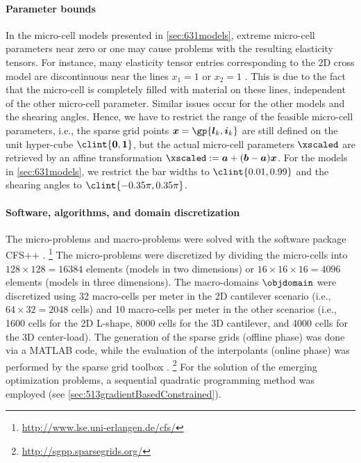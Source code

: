 \paragraph{Parameter bounds}

In the micro-cell models presented in \cref{sec:631models},
extreme micro-cell parameters near zero or one may cause problems
with the resulting elasticity tensors.
For instance, many elasticity tensor entries corresponding to
the 2D cross model are discontinuous near the lines $x_1 = 1$ or $x_2 = 1$
.
This is due to the fact that the micro-cell is completely filled with material
on these lines,
independent of the other micro-cell parameter.
Similar issues occur for the other models and the shearing angles.
Hence, we have to restrict the range of the feasible micro-cell parameters,
i.e., the sparse grid points
$\*x = \gp{\*l_k,\*i_k}$ are still defined on the unit hyper-cube
$\clint{\*0, \*1}$,
but the actual micro-cell parameters $\xscaled$ are retrieved by an
affine transformation $\xscaled := \*a + (\*b - \*a) \*x$.
For the models in \cref{sec:631models},
we restrict the bar widths to $\clint{0.01, 0.99}$ and
the shearing angles to $\clint{-0.35\pi, 0.35\pi}$.

\paragraph{Software, algorithms, and domain discretization}

The micro-problems and macro-problems were solved with the
\fem software package CFS++ \cite{Kaltenbacher10Advanced}.%
\footnote{%
  \url{http://www.lse.uni-erlangen.de/cfs/}%
}
The micro-pro\-blems were discretized by dividing the micro-cells into
$128 \times 128 = \num{16384}$ elements (models in two dimensions) or
$16 \times 16 \times 16 = \num{4096}$ elements (models in three dimensions).
The macro-domains $\objdomain$ were discretized using
32 macro-cells per meter in the 2D cantilever scenario
(i.e., $64 \times 32 = 2048$ cells) and
10 macro-cells per meter in the other scenarios
(i.e.,
\num{1600} cells for the 2D L-shape,
\num{8000} cells for the 3D cantilever, and
\num{4000} cells for the 3D center-load).
The generation of the sparse grids (offline phase) was done via a MATLAB code,
while the evaluation of the interpolants (online phase) was performed
by the sparse grid toolbox \sgpp \cite{Pflueger10Spatially}.%
\footnote{%
  \url{http://sgpp.sparsegrids.org/}%
}
For the solution of the emerging optimization problems,
a sequential quadratic programming method was employed
(see \cref{sec:513gradientBasedConstrained}).



